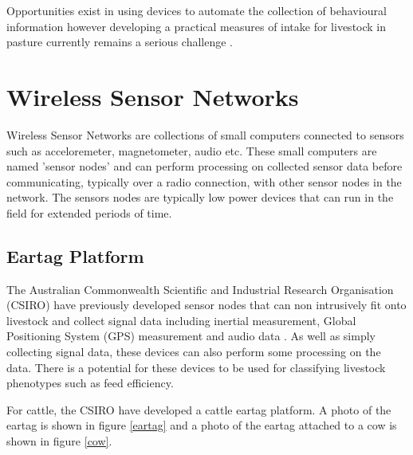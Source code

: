 Opportunities exist in using devices to automate the collection of behavioural information however developing a practical measures of intake for livestock in pasture currently remains a serious challenge \cite{Cottle2013}. 

\section{Wireless Sensor Networks}
Wireless Sensor Networks are collections of small computers connected to sensors such as acceloremeter, magnetometer, audio etc. These small computers are named 'sensor nodes' and can perform processing on collected sensor data before communicating, typically over a radio connection, with other sensor nodes in the network. The sensors nodes are typically low power devices that can run in the field for extended periods of time. 

\subsection{Eartag Platform}

The Australian Commonwealth Scientific and Industrial Research Organisation (CSIRO) have previously developed sensor nodes that can non intrusively fit onto livestock and collect signal data including inertial measurement, Global Positioning System (GPS) measurement and audio data \cite{Guo2006}. As well as simply collecting signal data, these devices can also perform some processing on the data. There is a potential for these devices to be used for classifying livestock phenotypes such as feed efficiency.

For cattle, the CSIRO have developed a cattle eartag platform. A photo of the eartag is shown in figure \ref{eartag} and a photo of the eartag attached to a cow is shown in figure \ref{cow}.

